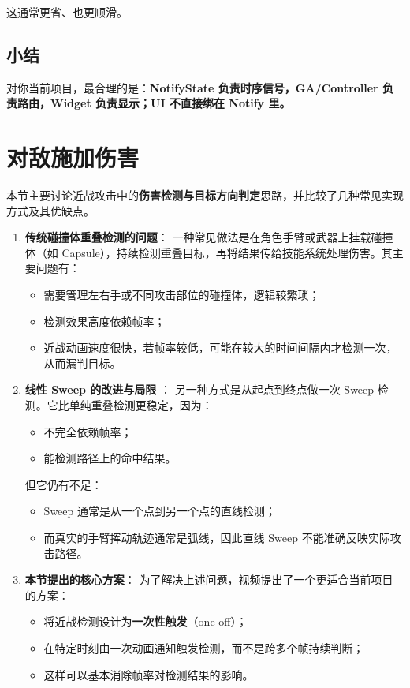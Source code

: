 这通常更省、也更顺滑。

\subsection{小结}

对你当前项目，最合理的是：\textbf{NotifyState 负责时序信号，GA/Controller 负责路由，Widget 负责显示；UI 不直接绑在 Notify 里。}

\section{对敌施加伤害}

本节主要讨论近战攻击中的\textbf{伤害检测与目标方向判定}思路，并比较了几种常见实现方式及其优缺点。
\begin{enumerate}
	
	\item \textbf{传统碰撞体重叠检测的问题}：
	一种常见做法是在角色手臂或武器上挂载碰撞体（如 Capsule），持续检测重叠目标，再将结果传给技能系统处理伤害。其主要问题有：
	\begin{itemize}
		\item 需要管理左右手或不同攻击部位的碰撞体，逻辑较繁琐；
		\item 检测效果高度依赖帧率；
		\item 近战动画速度很快，若帧率较低，可能在较大的时间间隔内才检测一次，从而漏判目标。
	\end{itemize}
	
	\item \textbf{线性 Sweep 的改进与局限} ： 
	另一种方式是从起点到终点做一次 Sweep 检测。它比单纯重叠检测更稳定，因为：
	\begin{itemize}
		\item 不完全依赖帧率；
		\item 能检测路径上的命中结果。
	\end{itemize}
	但它仍有不足：
	\begin{itemize}
		\item Sweep 通常是从一个点到另一个点的直线检测；
		\item 而真实的手臂挥动轨迹通常是弧线，因此直线 Sweep 不能准确反映实际攻击路径。
	\end{itemize}
	
	\item \textbf{本节提出的核心方案}：
	为了解决上述问题，视频提出了一个更适合当前项目的方案：
	\begin{itemize}
		\item 将近战检测设计为\textbf{一次性触发}（one-off）；
		\item 在特定时刻由一次动画通知触发检测，而不是跨多个帧持续判断；
		\item 这样可以基本消除帧率对检测结果的影响。
	\end{itemize}
	

\end{enumerate}

